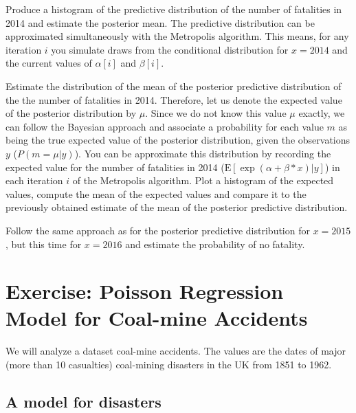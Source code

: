 
 
Produce a histogram of the predictive distribution of the number of fatalities in 2014 and estimate the posterior mean. 
The predictive distribution can be approximated simultaneously with the Metropolis algorithm. 
This means, for any iteration $i$ you simulate draws from the conditional distribution for $x = 2014$ and the current values of $\alpha[i]$ and $\beta[i]$.
 
Estimate the distribution of the mean of the posterior predictive distribution of the the number of fatalities in 2014. 
Therefore, let us denote the expected value of the posterior distribution by $\mu$. 
Since we do not know this value $\mu$ exactly, we can follow the Bayesian approach and associate a probability for each value $m$ as being the true expected value of the posterior distribution, given the observations $y$ ($P(m = \mu|y)$).
You can be approximate this distribution by recording the expected value for the number of fatalities in 2014 ($\text{E}[\exp(\alpha+\beta*x)|y]$) in each iteration $i$ of the Metropolis algorithm. 
Plot a histogram of the expected values, compute the mean of the expected values and compare it to the previously obtained estimate of the mean of the posterior predictive distribution.
 
Follow the same approach as for the posterior predictive distribution for $x = 2015$, but this time for $x = 2016$ and estimate the probability of no fatality. 
 
 
 
 

\newpage
\FloatBarrier
\section{Exercise: Poisson Regression Model for Coal-mine Accidents}
 
We will analyze a dataset coal-mine accidents.
The values are the dates of major (more than 10 casualties) coal-mining disasters in the UK from 1851 to 1962. 


\subsection*{A model for disasters}

